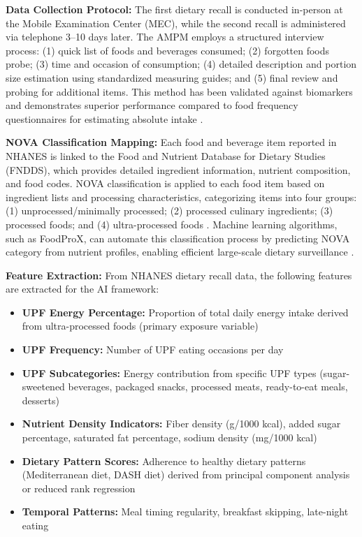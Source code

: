 \documentclass[journal,twoside,10pt]{IEEEtran}
\begin{document}
\textbf{Data Collection Protocol:}
The first dietary recall is conducted in-person at the Mobile Examination Center (MEC), while the second recall is administered via telephone 3--10 days later. The AMPM employs a structured interview process: (1) quick list of foods and beverages consumed; (2) forgotten foods probe; (3) time and occasion of consumption; (4) detailed description and portion size estimation using standardized measuring guides; and (5) final review and probing for additional items. This method has been validated against biomarkers and demonstrates superior performance compared to food frequency questionnaires for estimating absolute intake \cite{ref18,ref47}.

\textbf{NOVA Classification Mapping:}
Each food and beverage item reported in NHANES is linked to the Food and Nutrient Database for Dietary Studies (FNDDS), which provides detailed ingredient information, nutrient composition, and food codes. NOVA classification is applied to each food item based on ingredient lists and processing characteristics, categorizing items into four groups: (1) unprocessed/minimally processed; (2) processed culinary ingredients; (3) processed foods; and (4) ultra-processed foods \cite{ref18,ref48}. Machine learning algorithms, such as FoodProX, can automate this classification process by predicting NOVA category from nutrient profiles, enabling efficient large-scale dietary surveillance \cite{ref48}.

\textbf{Feature Extraction:}
From NHANES dietary recall data, the following features are extracted for the AI framework:
\begin{itemize}
\item \textbf{UPF Energy Percentage:} Proportion of total daily energy intake derived from ultra-processed foods (primary exposure variable)
\item \textbf{UPF Frequency:} Number of UPF eating occasions per day
\item \textbf{UPF Subcategories:} Energy contribution from specific UPF types (sugar-sweetened beverages, packaged snacks, processed meats, ready-to-eat meals, desserts)
\item \textbf{Nutrient Density Indicators:} Fiber density (g/1000 kcal), added sugar percentage, saturated fat percentage, sodium density (mg/1000 kcal)
\item \textbf{Dietary Pattern Scores:} Adherence to healthy dietary patterns (Mediterranean diet, DASH diet) derived from principal component analysis or reduced rank regression
\item \textbf{Temporal Patterns:} Meal timing regularity, breakfast skipping, late-night eating
\end{itemize}
\end{document}

